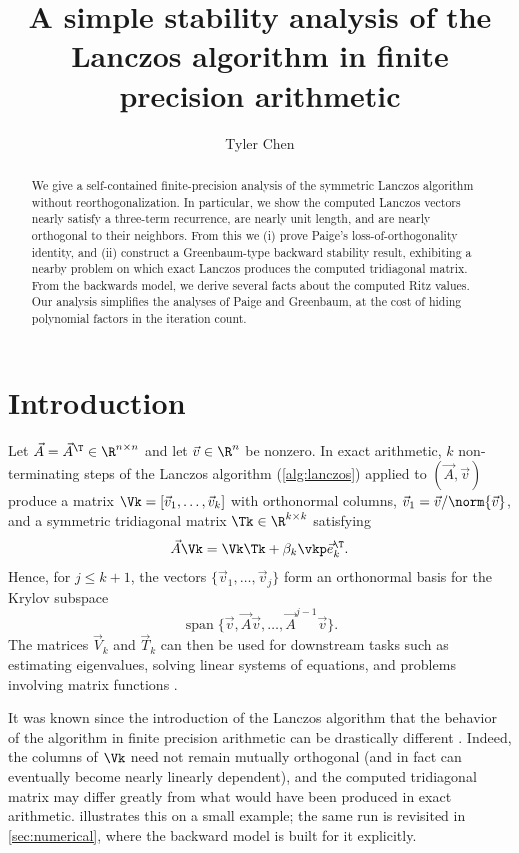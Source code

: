 

\title{A simple stability analysis of the Lanczos algorithm in finite precision arithmetic}
\author{Tyler Chen}
\date{}

\maketitle

\begin{abstract}
We give a self-contained finite-precision analysis of the symmetric Lanczos algorithm without reorthogonalization.
In particular, we show the computed Lanczos vectors nearly satisfy a three-term recurrence, are nearly unit length, and are nearly orthogonal to their neighbors.
From this we (i) prove Paige's loss-of-orthogonality identity, and (ii) construct a Greenbaum-type backward stability result, exhibiting a nearby problem on which exact Lanczos produces the computed tridiagonal matrix.
From the backwards model, we derive several facts about the computed Ritz values.
Our analysis simplifies the analyses of Paige and Greenbaum, at the cost of hiding polynomial factors in the iteration count.
\end{abstract}


\section{Introduction}

Let \(\vec A=\vec A^\T\in\R^{n\times n}\) and let $\vec{v}\in\R^n$ be nonzero.
In exact arithmetic, \(k\) non-terminating steps of the Lanczos algorithm (\cref{alg:lanczos}) applied to \((\vec A,\vec v)\) produce a matrix \(\Vk = [\vec{v}_1, \ldots, \vec{v}_k]\) with orthonormal columns, \(\vec v_1=\vec v/\norm{\vec v}\), and a symmetric tridiagonal matrix \(\Tk\in\R^{k\times k}\) satisfying
\[
 \vec A\Vk=\Vk\Tk+\beta_k\vkp\vec e_k^\T.
\]
Hence, for $j\leq k+1$, the vectors $\{\vec{v}_1, \ldots, \vec{v}_{j}\}$ form an orthonormal basis for the Krylov subspace
\[
\operatorname{span}\{\vec{v},\vec{A}\vec{v}, \ldots, \vec{A}^{j-1}\vec{v}\}.
\]
The matrices $\vec{V}_k$ and $\vec{T}_k$ can then be used for downstream tasks such as estimating eigenvalues, solving linear systems of equations, and problems involving matrix functions \cite{meurant2006,greenbaum1997,saad2011,tropp_webber2023,chen2024}.

It was known since the introduction of the Lanczos algorithm that the behavior of the algorithm in finite precision arithmetic can be drastically different \cite{lanczos1950}.
Indeed, the columns of \(\Vk\) need not remain mutually orthogonal (and in fact can eventually become nearly linearly dependent), and the computed tridiagonal matrix may differ greatly from what would have been produced in exact arithmetic.
 illustrates this on a small example; the same run is revisited in \cref{sec:numerical}, where the backward model is built for it explicitly.

